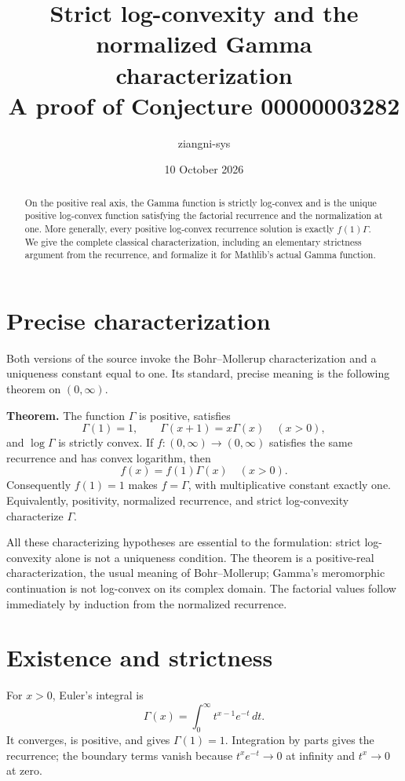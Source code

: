 \documentclass[11pt]{article}
\title{Strict log-convexity and the normalized Gamma characterization\\A proof of Conjecture 00000003282}
\author{ziangni-sys}\date{10 October 2026}
\begin{document}
\maketitle
\begin{abstract}
On the positive real axis, the Gamma function is strictly log-convex and is the unique positive log-convex function satisfying the factorial recurrence and the normalization at one. More generally, every positive log-convex recurrence solution is exactly $f(1)\Gamma$. We give the complete classical characterization, including an elementary strictness argument from the recurrence, and formalize it for Mathlib's actual Gamma function.
\end{abstract}

\section{Precise characterization}
Both versions of the source invoke the Bohr--Mollerup characterization and a uniqueness constant equal to one. Its standard, precise meaning is the following theorem on $(0,\infty)$.

\medskip\noindent\textbf{Theorem.} The function $\Gamma$ is positive, satisfies
\[
\Gamma(1)=1,\qquad \Gamma(x+1)=x\Gamma(x)\quad(x>0),
\]
and $\log\Gamma$ is strictly convex. If $f:(0,\infty)\to(0,\infty)$ satisfies the same recurrence and has convex logarithm, then
\[
f(x)=f(1)\Gamma(x)\quad(x>0).
\]
Consequently $f(1)=1$ makes $f=\Gamma$, with multiplicative constant exactly one. Equivalently, positivity, normalized recurrence, and strict log-convexity characterize $\Gamma$.

All these characterizing hypotheses are essential to the formulation: strict log-convexity alone is not a uniqueness condition. The theorem is a positive-real characterization, the usual meaning of Bohr--Mollerup; Gamma's meromorphic continuation is not log-convex on its complex domain. The factorial values follow immediately by induction from the normalized recurrence.

\section{Existence and strictness}
For $x>0$, Euler's integral is
\[
\Gamma(x)=\int_0^\infty t^{x-1}e^{-t}\,dt.
\]
It converges, is positive, and gives $\Gamma(1)=1$. Integration by parts gives the recurrence; the boundary terms vanish because $t^xe^{-t}\to0$ at infinity and $t^x\to0$ at zero.
\end{document}
